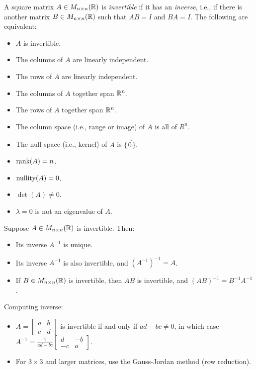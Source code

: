 \begin{definition}
	A square matrix $A \in M_{n \times n}({\mathbb{R}})$ is \emph{invertible} if it has an
	\emph{inverse}, i.e., if there is another matrix $B \in M_{n \times n}({\mathbb{R}})$
	such that $AB = I$ and $BA = I$. The following are equivalent:
	\begin{itemize}
		\item $A$ is invertible.
		\item The columns of $A$ are linearly independent.
		\item The rows of $A$ are linearly independent.
		\item The columns of $A$ together span ${\mathbb{R}}^n$.
		\item The rows of $A$ together span ${\mathbb{R}}^n$.
		\item The column space (i.e., range or image) of $A$ is all of $R^n$.
		\item The null space (i.e., kernel) of $A$ is $\{\vec{0}\}$.
		\item $\text{rank}(A) = n$.
		\item $\text{nullity}(A) = 0$.
		\item $\det(A) \neq 0$.
		\item $\lambda = 0$ is not an eigenvalue of $A$.
	\end{itemize}
\end{definition}

\begin{facts}
	Suppose $A \in M_{n \times n}({\mathbb{R}})$ is invertible. Then:
	\begin{itemize}
		\item Its inverse $A^{-1}$ is unique.
		\item Its inverse $A^{-1}$ is also invertible, and ${(A^{-1})}^{-1} = A$.
		\item If $B \in M_{n \times n}({\mathbb{R}})$ is invertible, then $AB$ is invertible,
			and ${(AB)}^{-1} = B^{-1} A^{-1}$.
	\end{itemize}
\end{facts}

\begin{facts}
	Computing inverse:
	\begin{itemize}
		\item $A =
			\begin{bmatrix}
				a & b \\
				c & d
			\end{bmatrix}$
			is invertible if and only if $ad - bc \neq 0$, in which case $A^{-1} =
			\frac{1}{ad - bc}
			\begin{bmatrix}
				d & -b \\
				-c & a
			\end{bmatrix}$.
		\item For $3 \times 3$ and larger matrices, use the Gauss-Jordan method (row
			reduction).
	\end{itemize}
\end{facts}

